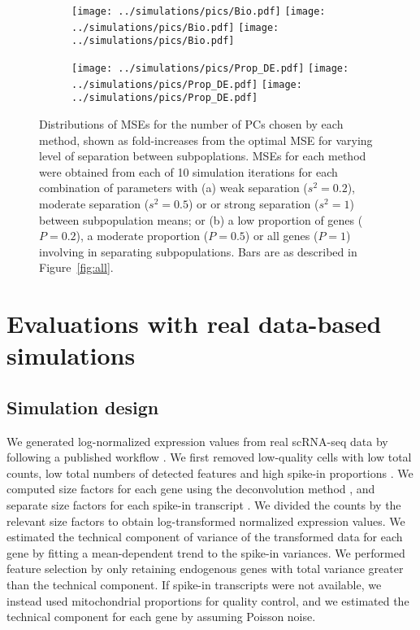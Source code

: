 \documentclass[10pt,letterpaper]{article}
\begin{document}
\begin{figure}
\begin{subfigure}[b]{\textwidth}
    \texttt{[image: ../simulations/pics/Bio.pdf]}
    \texttt{[image: ../simulations/pics/Bio.pdf]}
    \texttt{[image: ../simulations/pics/Bio.pdf]}
\caption{}
\end{subfigure}
\begin{subfigure}[b]{\textwidth}
    \texttt{[image: ../simulations/pics/Prop\_DE.pdf]}
    \texttt{[image: ../simulations/pics/Prop\_DE.pdf]}
    \texttt{[image: ../simulations/pics/Prop\_DE.pdf]}
\caption{}
\end{subfigure}
\caption{Distributions of MSEs for the number of PCs chosen by each method, shown as fold-increases from the optimal MSE for varying level of separation between subpoplations.
MSEs for each method were obtained from each of 10 simulation iterations for each combination of parameters with 
(a) weak separation ($s^2=0.2$), moderate separation ($s^2 = 0.5$) or or strong separation ($s^2 = 1$) between subpopulation means;
or (b) a low proportion of genes ($P = 0.2$), a moderate proportion ($P=0.5$) or all genes ($P=1$) involving in separating subpopulations.
Bars are as described in Figure~\ref{fig:all}.    
}
\label{fig:bio}
\end{figure}

\section{Evaluations with real data-based simulations}

\subsection{Simulation design}
We generated log-normalized expression values from real scRNA-seq data by following a published workflow \cite{lun2016stepbystep}.
We first removed low-quality cells with low total counts, low total numbers of detected features and high spike-in proportions \cite{mccarthy2017scater}.
We computed size factors for each gene using the deconvolution method \cite{lun2016pooling}, and separate size factors for each spike-in transcript \cite{lun2017assessing}.
We divided the counts by the relevant size factors to obtain log-transformed normalized expression values.
We estimated the technical component of variance of the transformed data for each gene by fitting a mean-dependent trend to the spike-in variances.
We performed feature selection by only retaining endogenous genes with total variance greater than the technical component.
If spike-in transcripts were not available, we instead used mitochondrial proportions for quality control,
and we estimated the technical component for each gene by assuming Poisson noise.  
\end{document}
